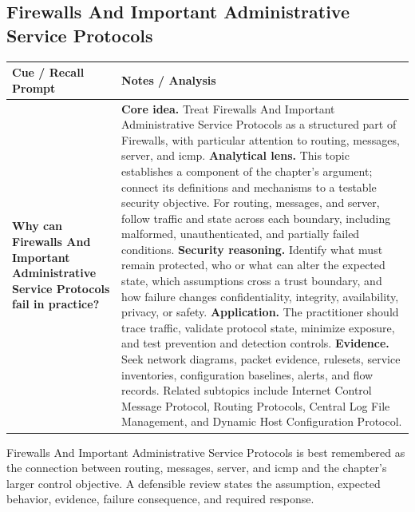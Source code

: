 \documentclass[11pt]{article}
\newcommand{\CornellHeader}{%
\rowcolor{Navy}\color{white}\bfseries Cue / Recall Prompt & \color{white}\bfseries Notes / Analysis\\\hline}
\newcommand{\CornellRow}[2]{%
\cellcolor{CueGray}\RaggedRight\textbf{#1} & \RaggedRight #2\\\hline}
\begin{document}
\subsection*{Firewalls And Important Administrative Service Protocols}
\begin{longtable}{>{\RaggedRight\arraybackslash}p{}|>{\RaggedRight\arraybackslash}p{}}
\CornellHeader
\CornellRow{Why can Firewalls And Important Administrative Service Protocols fail in practice?}{\textbf{Core idea.} Treat Firewalls And Important Administrative Service Protocols as a structured part of Firewalls, with particular attention to routing, messages, server, and icmp. \textbf{Analytical lens.} This topic establishes a component of the chapter's argument; connect its definitions and mechanisms to a testable security objective. For routing, messages, and server, follow traffic and state across each boundary, including malformed, unauthenticated, and partially failed conditions. \textbf{Security reasoning.} Identify what must remain protected, who or what can alter the expected state, which assumptions cross a trust boundary, and how failure changes confidentiality, integrity, availability, privacy, or safety. \textbf{Application.} The practitioner should trace traffic, validate protocol state, minimize exposure, and test prevention and detection controls. \textbf{Evidence.} Seek network diagrams, packet evidence, rulesets, service inventories, configuration baselines, alerts, and flow records. Related subtopics include Internet Control Message Protocol, Routing Protocols, Central Log File Management, and Dynamic Host Configuration Protocol.}
\end{longtable}
\begin{topicsummary}
Firewalls And Important Administrative Service Protocols is best remembered as the connection between routing, messages, server, and icmp and the chapter's larger control objective. A defensible review states the assumption, expected behavior, evidence, failure consequence, and required response.
\end{topicsummary}
\end{document}

